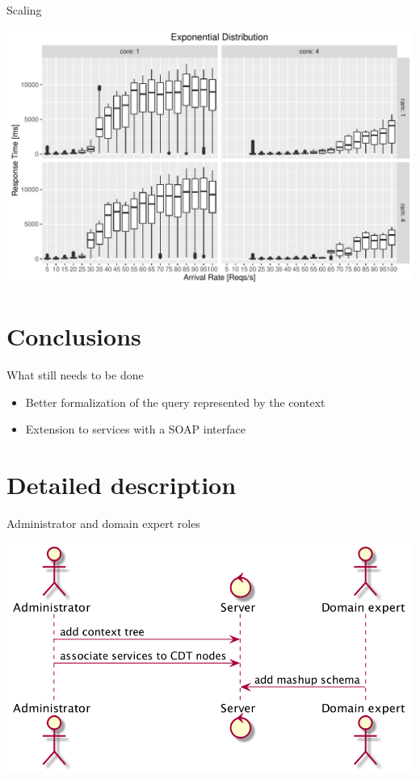 \documentclass[smaller]{beamer}
\begin{document}
\begin{frame}[label={sec:orgheadline26}]{Scaling}
\begin{center}
\includegraphics[width=.9\linewidth]{./images/exponential_analysis.pdf}
\end{center}
\end{frame}


\section{Conclusions}
\label{sec:orgheadline29}
\begin{frame}[label={sec:orgheadline28}]{What still needs to be done}
\begin{itemize}
\item Better formalization of the query represented by the context

\item Extension to services with a SOAP interface
\end{itemize}
\end{frame}


\section{Detailed description}
\label{sec:orgheadline31}
\begin{frame}[label={sec:orgheadline30}]{Administrator and domain expert roles}
\begin{center}
\includegraphics[width=.9\linewidth]{images/designtime.png}
\end{center}
\end{frame}
\end{document}
